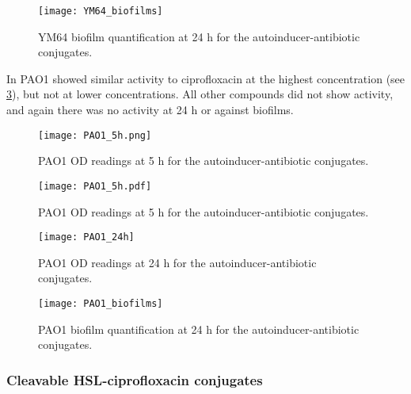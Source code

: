 \begin{figure}[H]
	\begin{center}
		\texttt{[image: YM64\_biofilms]}
		\caption{YM64 biofilm quantification at 24 h for the autoinducer-antibiotic conjugates.\label{fgr:YM64_biofilms}}
	\end{center}
\end{figure}

In PAO1  showed similar activity to ciprofloxacin  at the highest concentration (see \ref{fgr:PAO1_5h}), but not at lower concentrations. All other compounds did not show activity, and again there was no activity at 24 h or against biofilms. 

\begin{figure}[H]
	\begin{center}
		\texttt{[image: PAO1\_5h.png]}
		\caption{PAO1 OD readings at 5 h for the autoinducer-antibiotic conjugates.\label{fgr:PAO1_5h}}
	\end{center}
\end{figure}

\begin{figure}[H]
	\begin{center}
		\texttt{[image: PAO1\_5h.pdf]}
		\caption{PAO1 OD readings at 5 h for the autoinducer-antibiotic conjugates.\label{fgr:PAO1_5h}}
	\end{center}
\end{figure}

\begin{figure}[H]
	\begin{center}
		\texttt{[image: PAO1\_24h]}
		\caption{PAO1 OD readings at 24 h for the autoinducer-antibiotic conjugates.\label{fgr:PAO1_24h}}
	\end{center}
\end{figure}

\begin{figure}[H]
	\begin{center}
		\texttt{[image: PAO1\_biofilms]}
		\caption{PAO1 biofilm quantification at 24 h for the autoinducer-antibiotic conjugates.\label{fgr:PAO1_biofilms}}
	\end{center}
\end{figure}

\subsubsection{Cleavable HSL-ciprofloxacin conjugates}

